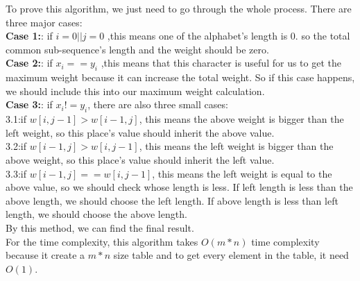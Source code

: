 \documentclass[paper=a4, fontsize=11pt]{scrartcl} %
\numberwithin{equation}{section} %
\numberwithin{figure}{section} %
\numberwithin{table}{section} %
\begin{document}
To prove this algorithm, we just need to go through the whole process. There are three major cases:\\
\textbf{Case 1:}: if $i=0 || j=0$ ,this means one of the alphabet's length is 0. so the total common sub-sequence's length and the weight should be zero.\\
\textbf{Case 2:}: if $x_i==y_i$ ,this means that this character is useful for us to get the maximum weight because it can increase the total weight. So if this case happens, we should include this into our maximum weight calculation.\\
\textbf{Case 3:}: if $x_i!=y_i$, there are also three small cases:\\
    3.1:if $w[i,j-1]>w[i-1,j]$, this means the above weight is bigger than the left weight, so this place's value should inherit the above value.\\
    3.2:if $w[i-1,j]>w[i,j-1]$, this means the left weight is bigger than the above weight, so this place's value should inherit the left value.\\
    3.3:if $w[i-1,j]==w[i,j-1]$, this means the left weight is equal to the above value, so we should check whose length is less. If left length is less than the above length, we should choose the left length. If above length is less than left length, we should choose the above length.\\
By this method, we can find the final result.\\
For the time complexity, this algorithm takes $O(m*n)$ time complexity because it create a $m*n$ size table and to get every element in the table, it need $O(1)$.

\vspace{8cm}
\end{document}
